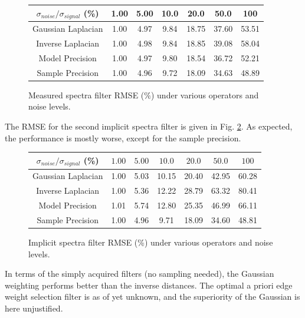 \documentclass[12pt,a4paper]{article} %
\begin{document}
\begin{figure}[!ht]
    \centering
    \begin{tabular}{|c|c|c|c|c|c|c|}
        \hline
        $\sigma_{noise}/\sigma_{signal}$ (\%) & 1.00 & 5.00 & 10.0 & 20.0 & 50.0 & 100 \\
        \hline
        \hline
        Gaussian Laplacian & 1.00 & 4.97 & 9.84 & 18.75 & 37.60 & 53.51 \\
        \hline
        Inverse Laplacian & 1.00 & 4.98 & 9.84 & 18.85 & 39.08 & 58.04 \\
        \hline
        Model Precision & 1.00 & 4.97 & 9.80 & 18.54 & 36.72 & 52.21 \\
        \hline
        Sample Precision & 1.00 & 4.96 & 9.72 & 18.09 & 34.63 & 48.89 \\
        \hline
    \end{tabular}
    \caption{Measured spectra filter RMSE ($\%$) under various operators and noise levels.}
    \label{fig:measured_filter}
\end{figure}
The RMSE for the second implicit spectra filter is given in Fig. \ref{fig:implicit_filter}. As expected, the performance is mostly worse, except for the sample precision.
\begin{figure}[!ht]
    \centering
    \begin{tabular}{|c|c|c|c|c|c|c|}
        \hline
        $\sigma_{noise}/\sigma_{signal}$ (\%) & $1.00$ & $5.00$ & $10.0$ & $20.0$ & $50.0$ & $100$ \\
        \hline
        \hline
        Gaussian Laplacian & 1.00 & 5.03 & 10.15 & 20.40 & 42.95 & 60.28 \\
        \hline
        Inverse Laplacian & 1.00 & 5.36 & 12.22 & 28.79 & 63.32 & 80.41 \\
        \hline
        Model Precision & 1.01 & 5.74 & 12.80 & 25.35 & 46.99 & 66.11 \\
        \hline
        Sample Precision & 1.00 & 4.96 & 9.71 & 18.09 & 34.60 & 48.81 \\
        \hline
    \end{tabular}
    \caption{Implicit spectra filter RMSE (\%) under various operators and noise levels.}
    \label{fig:implicit_filter}
\end{figure}
In terms of the simply acquired filters (no sampling needed), the Gaussian weighting performs better than the inverse distances. The optimal a priori edge weight selection filter is as of yet unknown, and the superiority of the Gaussian is here unjustified.
\end{document}
